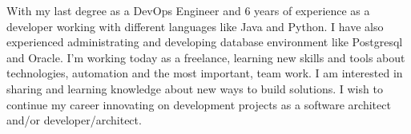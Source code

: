 %
%
%
\par{
With my last degree as a DevOps Engineer and 6 years of experience as a developer working with different languages like 
Java and Python. I have also experienced administrating and developing database environment like Postgresql and Oracle. 
I'm working today as a freelance, learning new skills and tools about technologies, automation and the most important, 
team work. I am interested in sharing and learning knowledge about new ways to build solutions. I wish to continue my career 
innovating on development projects as a software architect and/or developer/architect.
}
